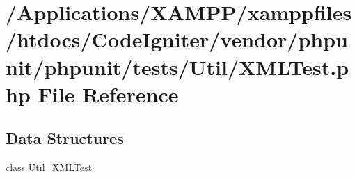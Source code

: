 \hypertarget{phpunit_2tests_2_util_2_x_m_l_test_8php}{}\section{/\+Applications/\+X\+A\+M\+P\+P/xamppfiles/htdocs/\+Code\+Igniter/vendor/phpunit/phpunit/tests/\+Util/\+X\+M\+L\+Test.php File Reference}
\label{phpunit_2tests_2_util_2_x_m_l_test_8php}
\subsection*{Data Structures}
\begin{DoxyCompactItemize}
\item 
class \mbox{\hyperlink{class_util___x_m_l_test}{Util\+\_\+\+X\+M\+L\+Test}}
\end{DoxyCompactItemize}
